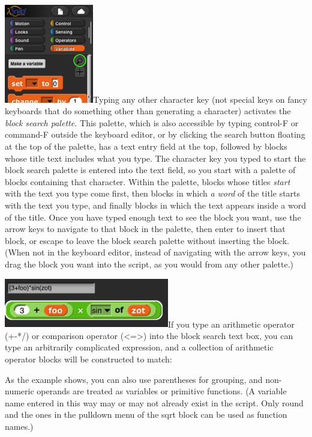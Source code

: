 \includegraphics[width=1.53472in,height=1.69444in]{media/image1110.png}Typing
any other character key (not special keys on fancy keyboards that do
something other than generating a character) activates the \emph{block
search palette.} This palette, which is also accessible by typing
control-F or command-F outside the keyboard editor, or by clicking the
search button floating at the top of the palette, has a text entry field
at the top, followed by blocks whose title text includes what you type.
The character key you typed to start the block search palette is entered
into the text field, so you start with a palette of blocks containing
that character. Within the palette, blocks whose titles \emph{start}
with the text you type come first, then blocks in which \emph{a word} of
the title starts with the text you type, and finally blocks in which the
text appears inside a word of the title. Once you have typed enough text
to see the block you want, use the arrow keys to navigate to that block
in the palette, then enter to insert that block, or escape to leave the
block search palette without inserting the block. (When not in the
keyboard editor, instead of navigating with the arrow keys, you drag the
block you want into the script, as you would from any other palette.)

\includegraphics[width=2.83333in,height=0.84097in]{media/image1111.png}If
you type an arithmetic operator (+-*/) or comparison operator
(\textless=\textgreater) into the block search text box, you can type an
arbitrarily complicated expression, and a collection of arithmetic
operator blocks will be constructed to match:

As the example shows, you can also use parentheses for grouping, and
non-numeric operands are treated as variables or primitive functions. (A
variable name entered in this way may or may not already exist in the
script. Only round and the ones in the pulldown menu of the sqrt block
can be used as function names.)

